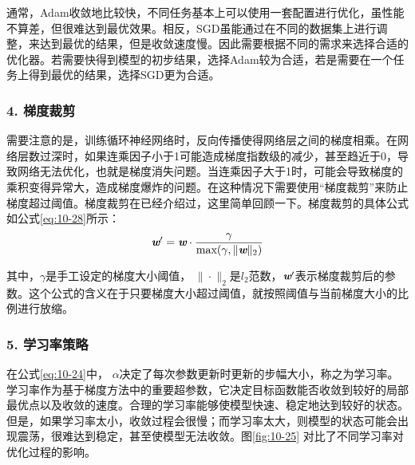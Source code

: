 \parinterval 通常，Adam收敛地比较快，不同任务基本上可以使用一套配置进行优化，虽性能不算差，但很难达到最优效果。相反，SGD虽能通过在不同的数据集上进行调整，来达到最优的结果，但是收敛速度慢。因此需要根据不同的需求来选择合适的优化器。若需要快得到模型的初步结果，选择Adam较为合适，若是需要在一个任务上得到最优的结果，选择SGD更为合适。


\subsubsection{4. 梯度裁剪}

\parinterval 需要注意的是，训练循环神经网络时，反向传播使得网络层之间的梯度相乘。在网络层数过深时，如果连乘因子小于1可能造成梯度指数级的减少，甚至趋近于0，导致网络无法优化，也就是梯度消失问题。当连乘因子大于1时，可能会导致梯度的乘积变得异常大，造成梯度爆炸的问题。在这种情况下需要使用“梯度裁剪”来防止梯度超过阈值。梯度裁剪在{\chapternine}已经介绍过，这里简单回顾一下。梯度裁剪的具体公式如公式\eqref{eq:10-28}所示：
\vspace{-0.5em}
\begin{eqnarray}
\textbf{\em w}' = \textbf{\em w} \cdot \frac{\gamma} {\textrm{max}(\gamma,\| \textbf{\em w} \|_2)}
\label{eq:10-28}
\end{eqnarray}

\noindent 其中，$\gamma$是手工设定的梯度大小阈值， $\| \cdot \|_2$是$l_2$范数，$\textbf{\em w}'$表示梯度裁剪后的参数。这个公式的含义在于只要梯度大小超过阈值，就按照阈值与当前梯度大小的比例进行放缩。


\subsubsection{5. 学习率策略}
\vspace{0.5em}

\parinterval 在公式\eqref{eq:10-24}中， $\alpha$决定了每次参数更新时更新的步幅大小，称之为学习率。学习率作为基于梯度方法中的重要超参数，它决定目标函数能否收敛到较好的局部最优点以及收敛的速度。合理的学习率能够使模型快速、稳定地达到较好的状态。但是，如果学习率太小，收敛过程会很慢；而学习率太大，则模型的状态可能会出现震荡，很难达到稳定，甚至使模型无法收敛。图\ref{fig:10-25} 对比了不同学习率对优化过程的影响。

